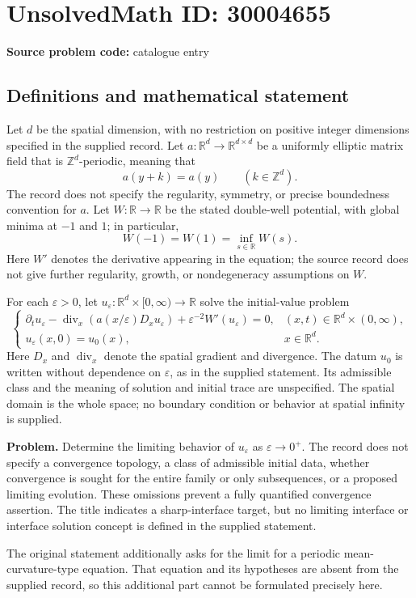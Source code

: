 \documentclass[11pt]{article}
\newcommand{\Z}{\mathbb{Z}}
\newcommand{\R}{\mathbb{R}}
\begin{document}
\section*{UnsolvedMath ID: 30004655}
\textbf{Source problem code:} catalogue entry
\subsection{Definitions and mathematical statement}
Let \(d\) be the spatial dimension, with no restriction on positive integer dimensions specified in the supplied record. Let \(a:\R^d\to\R^{d\times d}\) be a uniformly elliptic matrix field that is \(\Z^d\)-periodic, meaning that
\[
a(y+k)=a(y)\qquad (k\in\Z^d).
\]
The record does not specify the regularity, symmetry, or precise boundedness convention for \(a\). Let \(W:\R\to\R\) be the stated double-well potential, with global minima at \(-1\) and \(1\); in particular,
\[
W(-1)=W(1)=\inf_{s\in\R}W(s).
\]
Here \(W'\) denotes the derivative appearing in the equation; the source record does not give further regularity, growth, or nondegeneracy assumptions on \(W\).

For each \(\varepsilon>0\), let \(u_\varepsilon:\R^d\times[0,\infty)\to\R\) solve the initial-value problem
\[
\begin{cases}
\partial_tu_\varepsilon-\operatorname{div}_x\!\left(a(x/\varepsilon)D_xu_\varepsilon\right)+\varepsilon^{-2}W'(u_\varepsilon)=0,
& (x,t)\in\R^d\times(0,\infty),\\
u_\varepsilon(x,0)=u_0(x),&x\in\R^d.
\end{cases}
\]
Here \(D_x\) and \(\operatorname{div}_x\) denote the spatial gradient and divergence. The datum \(u_0\) is written without dependence on \(\varepsilon\), as in the supplied statement. Its admissible class and the meaning of solution and initial trace are unspecified. The spatial domain is the whole space; no boundary condition or behavior at spatial infinity is supplied.

\textbf{Problem.} Determine the limiting behavior of \(u_\varepsilon\) as \(\varepsilon\to0^+\). The record does not specify a convergence topology, a class of admissible initial data, whether convergence is sought for the entire family or only subsequences, or a proposed limiting evolution. These omissions prevent a fully quantified convergence assertion. The title indicates a sharp-interface target, but no limiting interface or interface solution concept is defined in the supplied statement.

The original statement additionally asks for the limit for a periodic mean-curvature-type equation. That equation and its hypotheses are absent from the supplied record, so this additional part cannot be formulated precisely here.
\end{document}
